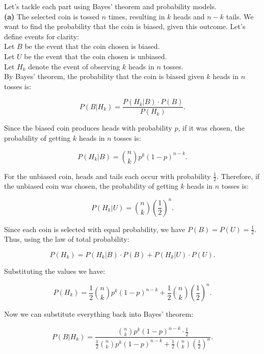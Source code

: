 \begin{solution}

    Let's tackle each part using Bayes' theorem and probability models.\\

    \textbf{(a)} The selected coin is tossed \( n \) times, resulting in \( k \) heads and \( n - k \) tails. We want to find the probability that the coin is biased, given this outcome. Let's define events for clarity:\\
    
    Let \( B \) be the event that the coin chosen is biased.\\
    Let \( U \) be the event that the coin chosen is unbiased.\\
    Let \( H_k \) denote the event of observing \( k \) heads in \( n \) tosses.\\
    
    By Bayes' theorem, the probability that the coin is biased given \( k \) heads in \( n \) tosses is:
    
    \[
    P(B | H_k) = \frac{P(H_k | B) \cdot P(B)}{P(H_k)}.
    \]
    
    Since the biased coin produces heads with probability \( p \), if it was chosen, the probability of getting \( k \) heads in \( n \) tosses is:
    
       \[
       P(H_k | B) = \binom{n}{k} p^k (1 - p)^{n - k}.
       \]
    
    For the unbiased coin, heads and tails each occur with probability \( \frac{1}{2} \). Therefore, if the unbiased coin was chosen, the probability of getting \( k \) heads in \( n \) tosses is:
    
       \[
       P(H_k | U) = \binom{n}{k} \left( \frac{1}{2} \right)^n.
       \]
    
    Since each coin is selected with equal probability, we have \( P(B) = P(U) = \frac{1}{2} \). Thus, using the law of total probability:
    
       \[
       P(H_k) = P(H_k | B) \cdot P(B) + P(H_k | U) \cdot P(U).
       \]
    
    Substituting the values we have:
    
       \[
       P(H_k) = \frac{1}{2} \binom{n}{k} p^k (1 - p)^{n - k} + \frac{1}{2} \binom{n}{k} \left( \frac{1}{2} \right)^n.
       \]
    
    Now we can substitute everything back into Bayes' theorem:
    
    \[
    P(B | H_k) = \frac{\binom{n}{k} p^k (1 - p)^{n - k} \cdot \frac{1}{2}}{\frac{1}{2} \binom{n}{k} p^k (1 - p)^{n - k} + \frac{1}{2} \binom{n}{k} \left( \frac{1}{2} \right)^n}.
    \]
    

\end{solution}
